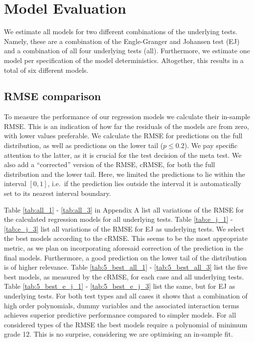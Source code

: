 \documentclass[12pt,a4paper]{article}
\begin{document}
\hypertarget{model-evaluation}{%
\section{Model Evaluation}\label{model-evaluation}}

We estimate all models for two different combinations of the underlying
tests. Namely, these are a combination of the Engle-Granger and Johansen
test (EJ) and a combination of all four underlying tests (all).
Furthermore, we estimate one model per specification of the model
deterministics. Altogether, this results in a total of six different
models.

\hypertarget{rmse-comparison}{%
\subsection{RMSE comparison}\label{rmse-comparison}}

To measure the performance of our regression models we calculate their
in-sample RMSE. This is an indication of how far the residuals of the
models are from zero, with lower values preferable. We calculate the
RMSE for predictions on the full distribution, as well as predictions on
the lower tail (\(p \leq 0.2\)). We pay specific attention to the
latter, as it is crucial for the test decision of the meta test. We also
add a ``corrected'' version of the RMSE, cRMSE, for both the full
distribution and the lower tail. Here, we limited the predictions to lie
within the interval \([0, 1]\), i.e.~if the prediction lies outside the
interval it is automatically set to its nearest interval boundary.

Table \ref{tab:all_1} - \ref{tab:all_3} in Appendix A list all
variations of the RMSE for the calculated regression models for all
underlying tests. Table \ref{tab:e_j_1} - \ref{tab:e_j_3} list all
variations of the RMSE for EJ as underlying tests. We select the best
models according to the cRMSE. This seems to be the most appropriate
metric, as we plan on incorporating aforesaid correction of the
prediction in the final models. Furthermore, a good prediction on the
lower tail of the distribution is of higher relevance. Table
\ref{tab:5_best_all_1} - \ref{tab:5_best_all_3} list the five best
models, as measured by the cRMSE, for each case and all underlying
tests. Table \ref{tab:5_best_e_j_1} - \ref{tab:5_best_e_j_3} list the
same, but for EJ as underlying tests. For both test types and all cases
it shows that a combination of high order polynomials, dummy variables
and the associated interaction terms achieves superior predictive
performance compared to simpler models. For all considered types of the
RMSE the best models require a polynomial of minimum grade 12. This is
no surprise, considering we are optimising an in-sample fit.
\end{document}
